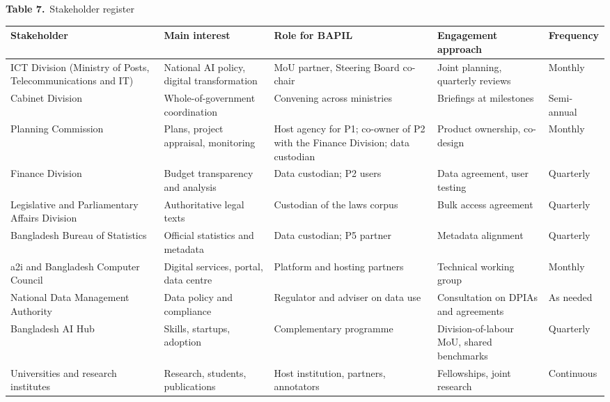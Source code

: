 \documentclass[border=10pt]{standalone}
\begin{document}
\begin{minipage}{17cm}
{\large\bfseries Table 7.}\ {\large Stakeholder register}\par\vspace{7pt}
\small
{}
\begin{tabularx}{\linewidth}{@{}>{\hsize=1.042\hsize\raggedright\arraybackslash}X>{\hsize=1.198\hsize\raggedright\arraybackslash}X>{\hsize=0.938\hsize\raggedright\arraybackslash}X>{\hsize=1.250\hsize\raggedright\arraybackslash}X>{\hsize=0.573\hsize\raggedright\arraybackslash}X@{}}
\arrayrulecolor{bapilrule}\toprule
\rowcolor{white}\textbf{Stakeholder} & \textbf{Main interest} & \textbf{Role for BAPIL} & \textbf{Engagement approach} & \textbf{Frequency} \\
\midrule
ICT Division (Ministry of Posts, Telecommunications and IT) & National AI policy, digital transformation & MoU partner, Steering Board co-chair & Joint planning, quarterly reviews & Monthly \\
Cabinet Division & Whole-of-government coordination & Convening across ministries & Briefings at milestones & Semi-annual \\
Planning Commission & Plans, project appraisal, monitoring & Host agency for P1; co-owner of P2 with the Finance Division; data custodian & Product ownership, co-design & Monthly \\
Finance Division & Budget transparency and analysis & Data custodian; P2 users & Data agreement, user testing & Quarterly \\
Legislative and Parliamentary Affairs Division & Authoritative legal texts & Custodian of the laws corpus & Bulk access agreement & Quarterly \\
Bangladesh Bureau of Statistics & Official statistics and metadata & Data custodian; P5 partner & Metadata alignment & Quarterly \\
a2i and Bangladesh Computer Council & Digital services, portal, data centre & Platform and hosting partners & Technical working group & Monthly \\
National Data Management Authority & Data policy and compliance & Regulator and adviser on data use & Consultation on DPIAs and agreements & As needed \\
Bangladesh AI Hub & Skills, startups, adoption & Complementary programme & Division-of-labour MoU, shared benchmarks & Quarterly \\
Universities and research institutes & Research, students, publications & Host institution, partners, annotators & Fellowships, joint research & Continuous \\

\end{tabularx}
\end{minipage}
\end{document}
